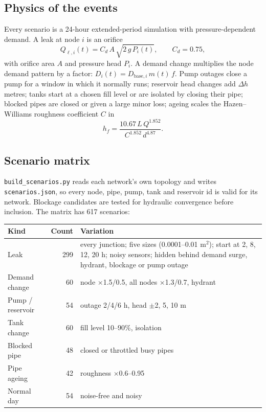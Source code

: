 \documentclass[11pt,a4paper]{article}
\newcommand{\code}[1]{\texttt{#1}}
\begin{document}
\subsection{Physics of the events}
Every scenario is a 24-hour extended-period simulation with pressure-dependent demand. A leak at node $i$ is an orifice
\begin{equation}Q_{\ell,i}(t)=C_d\,A\,\sqrt{2\,g\,P_i(t)},\qquad C_d=0.75,\label{eq:orifice}\end{equation}
with orifice area $A$ and pressure head $P_i$. A demand change multiplies the node demand pattern by a factor: $D_i(t)=D_{\text{base},i}\,m(t)\,f$. Pump outages close a pump for a window in which it normally runs; reservoir head changes add $\Delta h$ metres; tanks start at a chosen fill level or are isolated by closing their pipe; blocked pipes are closed or given a large minor loss; ageing scales the Hazen--Williams roughness coefficient $C$ in
\begin{equation}h_f=\frac{10.67\,L\,Q^{1.852}}{C^{1.852}\,d^{4.87}}.\end{equation}

\subsection{Scenario matrix}
\code{build\_scenarios.py} reads each network's own topology and writes \code{scenarios.json}, so every node, pipe, pump, tank and reservoir id is valid for its network. Blockage candidates are tested for hydraulic convergence before inclusion. The matrix has 617 scenarios:
\begin{center}\small\begin{tabular}{@{}lrp{8.5cm}@{}}\toprule
Kind & Count & Variation \\\midrule
Leak & 299 & every junction; five sizes (0.0001--0.01 m$^2$); start at 2, 8, 12, 20 h; noisy sensors; hidden behind demand surge, hydrant, blockage or pump outage \\
Demand change & 60 & node $\times$1.5/0.5, all nodes $\times$1.3/0.7, hydrant \\
Pump / reservoir & 54 & outage 2/4/6 h, head $\pm$2, 5, 10 m \\
Tank change & 60 & fill level 10--90\%, isolation \\
Blocked pipe & 48 & closed or throttled busy pipes \\
Pipe ageing & 42 & roughness $\times$0.6--0.95 \\
Normal day & 54 & noise-free and noisy \\\bottomrule\end{tabular}\end{center}
\end{document}
